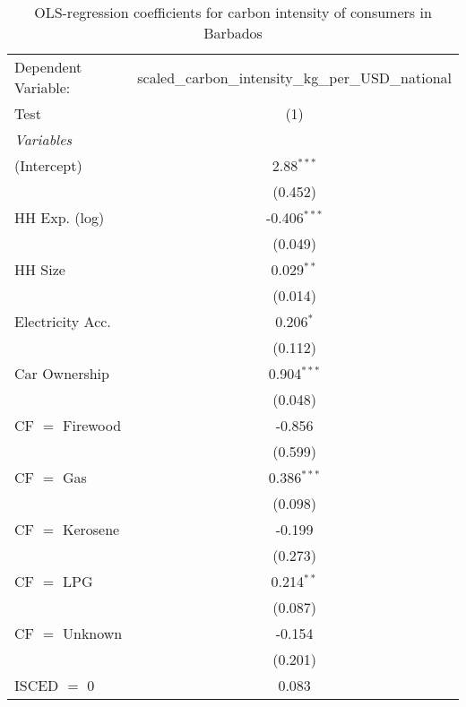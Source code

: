
\begin{table}[htbp!]
   \centering
   \small
   \begin{adjustbox}{width = 1\textwidth, max height = 0.95\textheight, center}
      \begin{threeparttable}[b]
         \caption{\label{tab:OLS_1_BRB} OLS-regression coefficients for carbon intensity of consumers in Barbados}
         \begin{tabular}{lc}
            \tabularnewline \midrule \midrule
            Dependent Variable: & scaled\_carbon\_intensity\_kg\_per\_USD\_national\\        
            Test                & (1)\\  
            \midrule
            \emph{Variables}\\
            (Intercept)         & 2.88$^{***}$\\   
                                & (0.452)\\   
            HH Exp. (log)       & -0.406$^{***}$\\   
                                & (0.049)\\   
            HH Size             & 0.029$^{**}$\\   
                                & (0.014)\\   
            Electricity Acc.    & 0.206$^{*}$\\   
                                & (0.112)\\   
            Car Ownership       & 0.904$^{***}$\\   
                                & (0.048)\\   
            CF $=$ Firewood     & -0.856\\   
                                & (0.599)\\   
            CF $=$ Gas          & 0.386$^{***}$\\   
                                & (0.098)\\   
            CF $=$ Kerosene     & -0.199\\   
                                & (0.273)\\   
            CF $=$ LPG          & 0.214$^{**}$\\   
                                & (0.087)\\   
            CF $=$ Unknown      & -0.154\\   
                                & (0.201)\\   
            ISCED $=$ 0         & 0.083\\   

\end{tabular}
\end{threeparttable}
\end{adjustbox}
\end{table}
